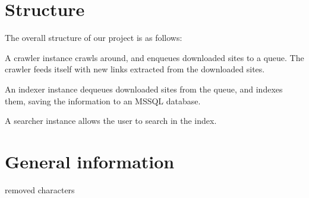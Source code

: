 \section{Structure}
The overall structure of our project is as follows:

A crawler instance crawls around, and enqueues downloaded sites to a queue. The crawler feeds itself with new links extracted from the downloaded sites.

An indexer instance dequeues downloaded sites from the queue, and indexes them, saving the information to an MSSQL database.

A searcher instance allows the user to search in the index.

\section{General information}\label{sec:rem-chars}
removed characters